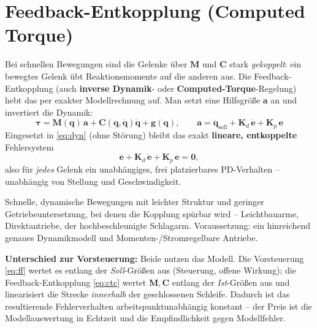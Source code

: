\section{Feedback-Entkopplung (Computed Torque)}
Bei schnellen Bewegungen sind die Gelenke über $\bm{M}$ und $\bm{C}$ stark
\emph{gekoppelt}: ein bewegtes Gelenk übt Reaktionsmomente auf die anderen aus.
Die Feedback-Entkopplung (auch \textbf{inverse Dynamik}- oder
\textbf{Computed-Torque}-Regelung) hebt das per exakter Modellrechnung auf. Man
setzt eine Hilfsgröße $\bm{a}$ an und invertiert die Dynamik:
\begin{equation}\label{eq:ctc}
\bm{\tau} = \bm{M}(\bm{q})\,\bm{a}
+ \bm{C}(\bm{q},\dot{\bm{q}})\dot{\bm{q}} + \bm{g}(\bm{q}),
\qquad
\bm{a} = \ddot{\bm{q}}_{\text{soll}} + \bm{K}_d\,\dot{\bm{e}} + \bm{K}_p\,\bm{e}
\end{equation}
Eingesetzt in \eqref{eq:dyn} (ohne Störung) bleibt das exakt \textbf{lineare,
entkoppelte} Fehlersystem
\begin{equation}
\ddot{\bm{e}} + \bm{K}_d\,\dot{\bm{e}} + \bm{K}_p\,\bm{e} = \bm{0},
\end{equation}
also für \emph{jedes} Gelenk ein unabhängiges, frei platzierbares
PD-Verhalten -- unabhängig von Stellung und Geschwindigkeit.
\begin{infobox}[title=Wann einsetzen]
Schnelle, dynamische Bewegungen mit leichter Struktur und geringer
Getriebeunter\-setzung, bei denen die Kopplung spürbar wird -- Leichtbauarme,
Direktantriebe, der hochbeschleunigte Schlagarm. Voraussetzung: ein hinreichend
genaues Dynamikmodell und Momenten-/Strom\-regelbare Antriebe.
\end{infobox}
\textbf{Unterschied zur Vorsteuerung:} Beide nutzen das Modell. Die Vorsteuerung
\eqref{eq:ff} wertet es entlang der \emph{Soll}-Größen aus (Steuerung, offene
Wirkung); die Feedback-Entkopplung \eqref{eq:ctc} wertet $\bm{M},\bm{C}$ entlang
der \emph{Ist}-Größen aus und linearisiert die Strecke \emph{innerhalb} der
geschlossenen Schleife. Dadurch ist das resultierende Fehlerverhalten
arbeitspunktunabhängig konstant -- der Preis ist die Modellauswertung in
Echtzeit und die Empfindlichkeit gegen Modellfehler.

